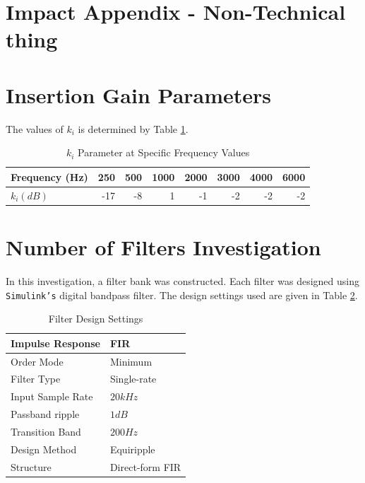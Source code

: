 \documentclass[12pt, onecolumn]{article}
\begin{document}
\begin{appendices}

\section{Impact Appendix - Non-Technical thing}


\section{Insertion Gain Parameters}
\label{app:insertGainParam}

\noindent The values of $k_i$ is determined by Table \ref{tab:kiVal}.

\begin{table}[htbp]
  \centering
  \caption{$k_i$ Parameter at Specific Frequency Values}
    \begin{tabular}{|l|r|r|r|r|r|r|r|}
    \hline
    \textbf{Frequency (Hz)} & 250   & 500   & 1000  & 2000  & 3000  & 4000  & 6000 \\
    \hline
    \textbf{$k_i (dB)$} & -17   & -8    & 1     & -1    & -2    & -2    & -2 \\
    \hline
    \end{tabular}%
  \label{tab:kiVal}%
\end{table}%


\section{Number of Filters Investigation}
\label{app:numFilt}

\noindent In this investigation, a filter bank was constructed. Each filter was designed using \texttt{Simulink's} digital bandpass filter. The design settings used are given in Table \ref{tab:numFilt_FiltSpec}.

\begin{table}[htbp]
  \centering
  \caption{Filter Design Settings}
  
    \begin{tabular}{|l|l|}
    \hline
    Impulse Response  & FIR  \\
    \hline
    Order Mode & Minimum \\
    \hline
    Filter Type & Single-rate \\
    \hline
    Input Sample Rate & $20kHz$ \\
    \hline
    Passband ripple & $1dB$ \\
    \hline
    Transition Band & $200Hz$ \\
    \hline
    Design Method & Equiripple \\
    \hline
    Structure  & Direct-form FIR \\
    \hline
    \end{tabular}%
  \label{tab:numFilt_FiltSpec}%
\end{table}%


\end{appendices}
\end{document}

